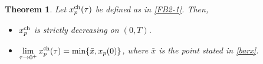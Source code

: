 \documentclass[11pt, a4paper, leqno]{amsart}
\numberwithin{equation}{section}
\theoremstyle{plain}
\newtheorem{theorem}{Theorem}[section]
\theoremstyle{definition}
\theoremstyle{remark}
\begin{document}


\begin{theorem}\label{thm:free-p}
Let $x_p^{\rm ch}(\tau)$ be defined as in \eqref{FB2-1}. Then,
\begin{itemize}
\item[i)] $x_p^{\rm ch}$ is strictly decreasing on $(0,T)$.
\item[ii)] $\displaystyle{\lim_{\tau \to 0^+}x_p^{\rm ch}(\tau)}
=\min\{\bar{x},{x_p}(0)\}$,
where $\bar{x}$ is the point stated in \eqref{barx}.
\end{itemize}
\end{theorem}
\end{document}
